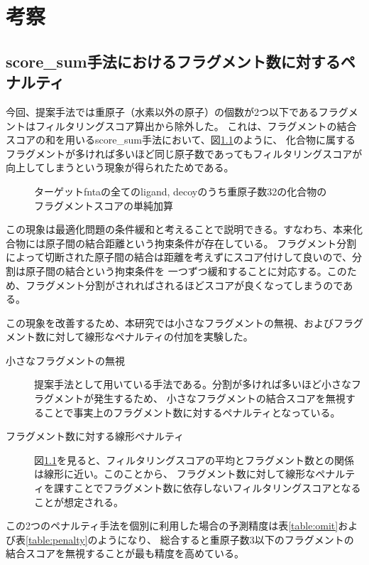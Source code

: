 \chapter{考察}

\section{score\_sum手法におけるフラグメント数に対するペナルティ}
今回、提案手法では重原子（水素以外の原子）の個数が2つ以下であるフラグメントはフィルタリングスコア算出から除外した。
これは、フラグメントの結合スコアの和を用いるscore\_sum手法において、図\ref{fig:no_omit_score_graph}のように、
化合物に属するフラグメントが多ければ多いほど同じ原子数であってもフィルタリングスコアが向上してしまうという現象が得られたためである。
\begin{figure}[bt]
 \begin{center}
  \caption{ターゲットfntaの全てのligand, decoyのうち重原子数32の化合物のフラグメントスコアの単純加算}
  \label{fig:no_omit_score_graph}
 \end{center}
\end{figure}
この現象は最適化問題の条件緩和と考えることで説明できる。すなわち、本来化合物には原子間の結合距離という拘束条件が存在している。
フラグメント分割によって切断された原子間の結合は距離を考えずにスコア付けして良いので、分割は原子間の結合という拘束条件を
一つずつ緩和することに対応する。このため、フラグメント分割がされればされるほどスコアが良くなってしまうのである。

この現象を改善するため、本研究では小さなフラグメントの無視、およびフラグメント数に対して線形なペナルティの付加を実験した。
\begin{description}
\item[小さなフラグメントの無視] 提案手法として用いている手法である。分割が多ければ多いほど小さなフラグメントが発生するため、
	小さなフラグメントの結合スコアを無視することで事実上のフラグメント数に対するペナルティとなっている。
\item[フラグメント数に対する線形ペナルティ]
	図\ref{fig:no_omit_score_graph}を見ると、フィルタリングスコアの平均とフラグメント数との関係は線形に近い。このことから、
	フラグメント数に対して線形なペナルティを課すことでフラグメント数に依存しないフィルタリングスコアとなることが想定される。
\end{description}
この2つのペナルティ手法を個別に利用した場合の予測精度は表\ref{table:omit}および表\ref{table:penalty}のようになり、
総合すると重原子数3以下のフラグメントの結合スコアを無視することが最も精度を高めている。


